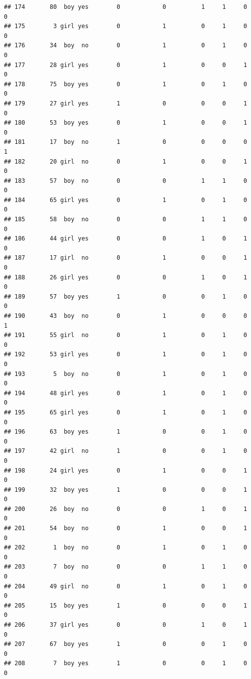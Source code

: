 \documentclass[man]{apa6}
\begin{document}
\begin{verbatim}
## 174       80  boy yes        0            0          1     1     0     0
## 175        3 girl yes        0            1          0     1     0     0
## 176       34  boy  no        0            1          0     1     0     0
## 177       28 girl yes        0            1          0     0     1     0
## 178       75  boy yes        0            1          0     1     0     0
## 179       27 girl yes        1            0          0     0     1     0
## 180       53  boy yes        0            1          0     0     1     0
## 181       17  boy  no        1            0          0     0     0     1
## 182       20 girl  no        0            1          0     0     1     0
## 183       57  boy  no        0            0          1     1     0     0
## 184       65 girl yes        0            1          0     1     0     0
## 185       58  boy  no        0            0          1     1     0     0
## 186       44 girl yes        0            0          1     0     1     0
## 187       17 girl  no        0            1          0     0     1     0
## 188       26 girl yes        0            0          1     0     1     0
## 189       57  boy yes        1            0          0     1     0     0
## 190       43  boy  no        0            1          0     0     0     1
## 191       55 girl  no        0            1          0     1     0     0
## 192       53 girl yes        0            1          0     1     0     0
## 193        5  boy  no        0            1          0     1     0     0
## 194       48 girl yes        0            1          0     1     0     0
## 195       65 girl yes        0            1          0     1     0     0
## 196       63  boy yes        1            0          0     1     0     0
## 197       42 girl  no        1            0          0     1     0     0
## 198       24 girl yes        0            1          0     0     1     0
## 199       32  boy yes        1            0          0     0     1     0
## 200       26  boy  no        0            0          1     0     1     0
## 201       54  boy  no        0            1          0     0     1     0
## 202        1  boy  no        0            1          0     1     0     0
## 203        7  boy  no        0            0          1     1     0     0
## 204       49 girl  no        0            1          0     1     0     0
## 205       15  boy yes        1            0          0     0     1     0
## 206       37 girl yes        0            0          1     0     1     0
## 207       67  boy yes        1            0          0     1     0     0
## 208        7  boy yes        1            0          0     1     0     0

\end{verbatim}
\end{document}

